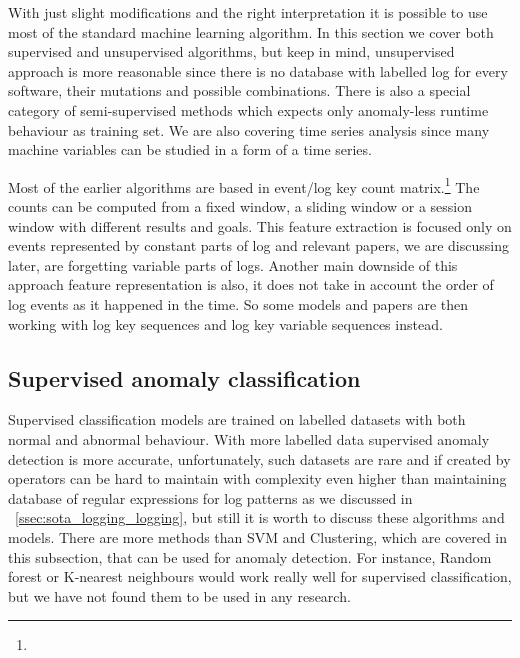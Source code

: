 With just slight modifications and the right interpretation it is possible to use  most of the standard machine learning algorithm. In this section we cover both supervised and unsupervised algorithms, but keep in mind, unsupervised approach is more reasonable since there is no database with labelled log for every software, their mutations and possible combinations. There is also a special category of semi-supervised methods which expects only anomaly-less runtime behaviour as training set. We are also covering time series analysis since many machine variables can be studied in a form of a time series.

Most of the earlier algorithms are based in event/log key count matrix.\footnote{} The counts can be computed from a fixed window, a sliding window or a session window with different results and goals. This feature extraction is focused only on events represented by constant parts of log and relevant papers, we are discussing later, are forgetting variable parts of logs. Another main downside of this approach feature representation is also, it does not take in account the order of log events as it happened in the time. So\ms{,} some  models and papers are then working with log key sequences and log key variable sequences instead.

\subsection{Supervised anomaly classification}

Supervised classification models are trained on labelled datasets with both normal and abnormal behaviour.  With more labelled data supervised anomaly detection is more accurate, unfortunately, such datasets are rare and if created by operators can be hard to maintain with complexity even higher than maintaining database of regular expressions for log patterns as we discussed in ~\ref{ssec:sota_logging_logging}, but still it is worth to discuss these algorithms and models.
There are more methods than SVM and Clustering, which are covered in this subsection, that can be used for anomaly detection. For instance, Random forest or K-nearest neighbours would work really well for supervised classification, but we have not found them to be used in any research.

